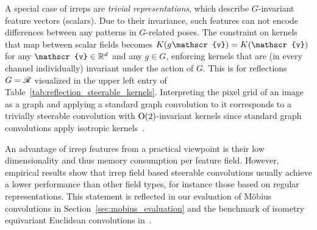 A special case of irreps are \emph{trivial representations}, which describe $G$-invariant feature vectors (scalars).
Due to their invariance, such features can not encode differences between any patterns in $G$-related poses.
The constraint on kernels that map between scalar fields becomes $K(g\mkern1mu \mathscr{v}) = K(\mathscr{v})$ for any $\mathscr{v} \in \R^d$ and any $g\in G$, enforcing kernels that are (in every channel individually) invariant under the action of $G$.
This is for reflections $G=\mathscr{R}$ visualized in the upper left entry of Table~\ref{tab:reflection_steerable_kernels}.
Interpreting the pixel grid of an image as a graph and applying a standard graph convolution to it corresponds to a trivially steerable convolution with $\operatorname{O}(2)$-invariant kernels since standard graph convolutions apply isotropic kernels~\cite{khasanova2018isometric}.

An advantage of irrep features from a practical viewpoint is their low dimensionality and thus memory consumption per feature field.
However, empirical results show that irrep field based steerable convolutions usually achieve a lower performance than other field types, for instance those based on regular representations.
This statement is reflected in our evaluation of M\"{o}bius convolutions in Section~\ref{sec:mobius_evaluation} and the benchmark of isometry equivariant Euclidean convolutions in~\cite{Weiler2019_E2CNN}.



